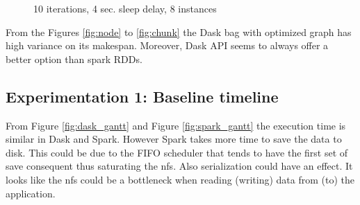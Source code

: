 \documentclass[11pt,a4paper]{article}
\begin{document}
\begin{figure}[p]
    \centering
    
    \caption{10 iterations, 4 sec. sleep delay, 8 instances}
    \label{fig:inc_chunk}
\end{figure}

From the Figures \ref{fig:node} to \ref{fig:chunk}  the Dask bag with optimized graph has high variance on its makespan. Moreover, Dask API seems to always offer a better option than spark RDDs. 

\subsection{Experimentation 1: Baseline timeline}
From Figure \ref{fig:dask_gantt} and Figure \ref{fig:spark_gantt} the execution time is similar in Dask and Spark. However Spark takes more time to save the data to disk. This could be due to the FIFO scheduler that tends to have the first set of save consequent thus saturating the nfs. Also serialization could have an effect. It looks like the nfs could be a bottleneck when reading (writing) data from (to) the application. 
\end{document}
